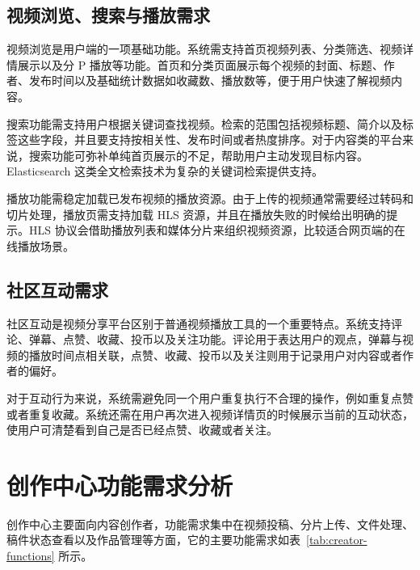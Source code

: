 \subsection{视频浏览、搜索与播放需求}
\label{subsec:browse-search-play-requirements}

视频浏览是用户端的一项基础功能。系统需支持首页视频列表、分类筛选、视频详情展示以及分 P 播放等功能。首页和分类页面展示每个视频的封面、标题、作者、发布时间以及基础统计数据如收藏数、播放数等，便于用户快速了解视频内容。

搜索功能需支持用户根据关键词查找视频。检索的范围包括视频标题、简介以及标签这些字段，并且要支持按相关性、发布时间或者热度排序。对于内容类的平台来说，搜索功能可弥补单纯首页展示的不足，帮助用户主动发现目标内容。Elasticsearch 这类全文检索技术为复杂的关键词检索提供支持\cite{elasticsearchdocs}。

播放功能需稳定加载已发布视频的播放资源。由于上传的视频通常需要经过转码和切片处理，播放页需支持加载 HLS 资源，并且在播放失败的时候给出明确的提示。HLS 协议会借助播放列表和媒体分片来组织视频资源，比较适合网页端的在线播放场景\cite{rfc8216hls}。

\subsection{社区互动需求}
\label{subsec:interaction-requirements}

社区互动是视频分享平台区别于普通视频播放工具的一个重要特点。系统支持评论、弹幕、点赞、收藏、投币以及关注功能。评论用于表达用户的观点，弹幕与视频的播放时间点相关联，点赞、收藏、投币以及关注则用于记录用户对内容或者作者的偏好。

对于互动行为来说，系统需避免同一个用户重复执行不合理的操作，例如重复点赞或者重复收藏。系统还需在用户再次进入视频详情页的时候展示当前的互动状态，使用户可清楚看到自己是否已经点赞、收藏或者关注。

\section{创作中心功能需求分析}
\label{sec:creator-center-requirements}

创作中心主要面向内容创作者，功能需求集中在视频投稿、分片上传、文件处理、稿件状态查看以及作品管理等方面，它的主要功能需求如表~\ref{tab:creator-functions} 所示。

